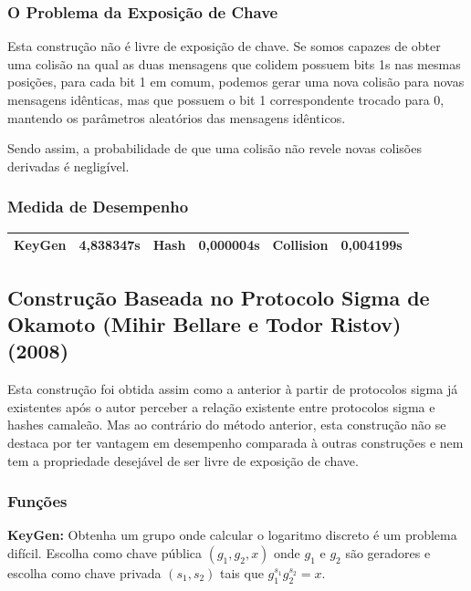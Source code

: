 \documentclass[a4paper]{article}
\begin{document}
\subsubsection{O Problema da Exposição de Chave}

Esta construção não é livre de exposição de chave. Se somos capazes de
obter uma colisão na qual as duas mensagens que colidem possuem bits
1s nas mesmas posições, para cada bit 1 em comum, podemos gerar uma
nova colisão para novas mensagens idênticas, mas que possuem o bit 1
correspondente trocado para 0, mantendo os parâmetros aleatórios das
mensagens idênticos.

Sendo assim, a probabilidade de que uma colisão não revele novas
colisões derivadas é negligível.

\subsubsection{Medida de Desempenho}

\begin{center}
\begin{tabular}{|c|c|c|c|c|c|}
  \hline
  KeyGen & 4,838347s & Hash & 0,000004s & Collision & 0,004199s\\
  \hline
\end{tabular}
\end{center}

\subsection{Construção Baseada no Protocolo Sigma de Okamoto
  (Mihir Bellare e Todor Ristov) (2008)\cite{sigma}}

Esta construção foi obtida assim como a anterior à partir de
protocolos sigma já existentes após o autor perceber a relação
existente entre protocolos sigma e hashes camaleão. Mas ao contrário
do método anterior, esta construção não se destaca por ter vantagem em
desempenho comparada à outras construções e nem tem a propriedade
desejável de ser livre de exposição de chave.

\subsubsection{Funções}

\textbf{KeyGen: } Obtenha um grupo onde calcular o logaritmo discreto
é um problema difícil. Escolha como chave pública $(g_1, g_2, x)$ onde
$g_1$ e $g_2$ são geradores e escolha como chave privada $(s_1, s_2)$
tais que $g_1^{s_1}g_2^{s_2} = x$.
\end{document}
